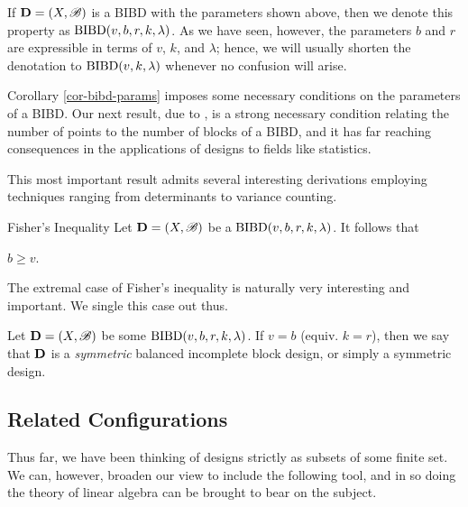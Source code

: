 \documentclass[../../../main]{subfiles}
\begin{document}
 If $\mathbf{D}=(X,\mathscr{B})$ is a BIBD with the parameters shown above, then we denote this property as $\text{BIBD}(v,b,r,k,\lambda)$. As we have seen, however, the parameters $b$ and $r$ are expressible in terms of $v$, $k$, and $\lambda$; hence, we will usually shorten the denotation to $\text{BIBD}(v,k,\lambda)$ whenever no confusion will arise.  

 Corollary \ref{cor-bibd-params} imposes some necessary conditions on the parameters of a BIBD. Our next result, due to \cite{fisher-inequality}, is a strong necessary condition relating the number of points to the number of blocks of a BIBD, and it has far reaching consequences in the applications of designs to fields like statistics.

 This most important result admits several interesting derivations employing
 techniques ranging from determinants to variance counting.

 \begin{namedthm}{Fisher's Inequality}
   Let $\mathbf{D}=(X,\mathscr{B})$ be a $\text{BIBD}(v,b,r,k,\lambda)$. It follows that 
   \begin{defenum}
   \item\label{fisher} $b \geq v$.
   \end{defenum}
 \end{namedthm}

 The extremal case of Fisher's inequality is naturally very interesting and important. We single this case out thus.

 \begin{defin}\label{square-design}
   Let $\mathbf{D}=(X,\mathscr{B})$ be some $\text{BIBD}(v,b,r,k,\lambda)$. If $v = b$ (equiv. $k =
   r$), then we say that $\mathbf{D}$ is a {\it symmetric} balanced incomplete block
   design, or simply a symmetric design.
 \end{defin}

 \subsection{Related Configurations}
 
Thus far, we have been thinking of designs strictly as subsets of some finite set. We can, however, broaden our view to include the following tool, and in so doing the theory of linear algebra can be brought to bear on the subject.
\end{document}
